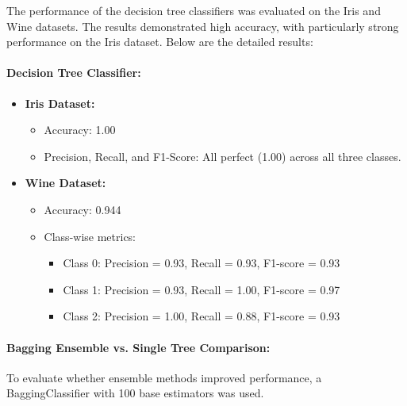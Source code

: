 \documentclass[a4paper,12pt]{article}
\begin{document}
The performance of the decision tree classifiers was evaluated on the Iris and Wine datasets. The results demonstrated high accuracy, with particularly strong performance on the Iris dataset. Below are the detailed results:

\paragraph{Decision Tree Classifier:}

\begin{itemize}
    \item \textbf{Iris Dataset:}
    \begin{itemize}
        \item Accuracy: 1.00
        \item Precision, Recall, and F1-Score: All perfect (1.00) across all three classes.
    \end{itemize}

    \item \textbf{Wine Dataset:}
    \begin{itemize}
        \item Accuracy: 0.944
        \item Class-wise metrics:
        \begin{itemize}
            \item Class 0: Precision = 0.93, Recall = 0.93, F1-score = 0.93
            \item Class 1: Precision = 0.93, Recall = 1.00, F1-score = 0.97
            \item Class 2: Precision = 1.00, Recall = 0.88, F1-score = 0.93
        \end{itemize}
    \end{itemize}
\end{itemize}

\paragraph{Bagging Ensemble vs. Single Tree Comparison:}

To evaluate whether ensemble methods improved performance, a BaggingClassifier with 100 base estimators was used.
\end{document}
